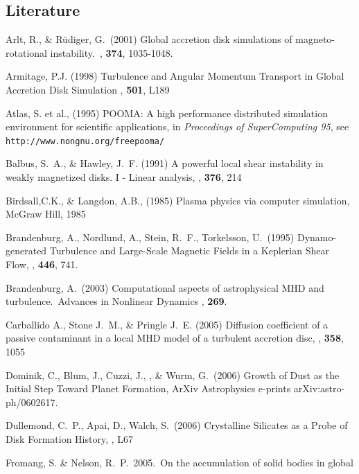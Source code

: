 \subsection{Literature}
%
%
%
\begin{literature}
\item Arlt, R., \& R{\"u}diger, G.\ (2001) Global accretion disk simulations of 
magneto-rotational instability.\ \aap, \textbf{374}, 1035-1048. 
 
\item Armitage, P.J. (1998)
  Turbulence and Angular Momentum Transport in Global Accretion Disk Simulation
  \apj, \textbf{501}, L189
\item Atlas, S. et al., (1995)
   POOMA: A high performance distributed simulation environment for
   scientific applications, in {\it Proceedings of SuperComputing 95},
   see {\tt http://www.nongnu.org/freepooma/}
\item Balbus, S.~A., \& Hawley, J.~F. (1991) 
   A powerful local shear instability in weakly magnetized disks. I - Linear analysis,
  \apj, \textbf{376}, 214
\item Birdsall,C.K., \& Langdon, A.B., (1985) Plasma physics via computer simulation,
McGraw Hill, 1985
\item Brandenburg, A., Nordlund, A., Stein, R.~F., Torkelsson, U.\ (1995) Dynamo-generated 
Turbulence and Large-Scale Magnetic Fields in a Keplerian Shear Flow,
  \apj, \textbf{446}, 741. 
\item Brandenburg, A.\ (2003)
Computational aspects of astrophysical MHD and turbulence.\ Advances in 
Nonlinear Dynamics , \textbf{269}. 
\item Carballido A., Stone J.~M., \& Pringle J.~E. (2005) 
  Diffusion coefficient of a passive contaminant in a local MHD model of a turbulent accretion disc,
  \mn, {\bf 358}, 1055
\item  Dominik, C., Blum, J.,  Cuzzi, J., , \& Wurm, G.\ (2006) 
  Growth of Dust as the Initial Step Toward Planet Formation,
  ArXiv Astrophysics e-prints arXiv:astro-ph/0602617. 
\item Dullemond, C.~P., Apai, D., Walch, S.\ (2006) 
   Crystalline Silicates as a Probe of Disk Formation History,
   , L67
\item Fromang, S. \& Nelson, R.~P.\ 2005.\ On the accumulation of solid bodies in global 

\end{literature}
